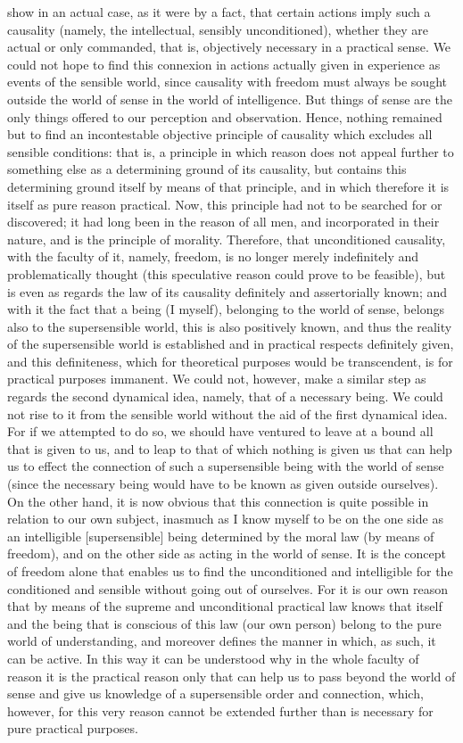 \documentclass[12pt]{article}
\begin{document}
show in an actual case, as it were by a fact, that certain actions imply such a causality (namely, the intellectual, sensibly unconditioned), whether they are actual or only commanded, that is, objectively necessary in a practical sense. We could not hope to find this connexion in actions actually given in experience as events of the sensible world, since causality with freedom must always be sought outside the world of sense in the world of intelligence. But things of sense are the only things offered to our perception and observation. Hence, nothing remained but to find an incontestable objective principle of causality which excludes all sensible conditions: that is, a principle in which reason does not appeal further to something else as a determining ground of its causality, but contains this determining ground itself by means of that principle, and in which therefore it is itself as pure reason practical. Now, this principle had not to be searched for or discovered; it had long been in the reason of all men, and incorporated in their nature, and is the principle of morality. Therefore, that unconditioned causality, with the faculty of it, namely, freedom, is no longer merely indefinitely and problematically thought (this speculative reason could prove to be feasible), but is even as regards the law of its causality definitely and assertorially known; and with it the fact that a being (I myself), belonging to the world of sense, belongs also to the supersensible world, this is also positively known, and thus the reality of the supersensible world is established and in practical respects definitely given, and this definiteness, which for theoretical purposes would be transcendent, is for practical purposes immanent. We could not, however, make a similar step as regards the second dynamical idea, namely, that of a necessary being. We could not rise to it from the sensible world without the aid of the first dynamical idea. For if we attempted to do so, we should have ventured to leave at a bound all that is given to us, and to leap to that of which nothing is given us that can help us to effect the connection of such a supersensible being with the world of sense (since the necessary being would have to be known as given outside ourselves). On the other hand, it is now obvious that this connection is quite possible in relation to our own subject, inasmuch as I know myself to be on the one side as an intelligible [supersensible] being determined by the moral law (by means of freedom), and on the other side as acting in the world of sense. It is the concept of freedom alone that enables us to find the unconditioned and intelligible for the conditioned and sensible without going out of ourselves. For it is our own reason that by means of the supreme and unconditional practical law knows that itself and the being that is conscious of this law (our own person) belong to the pure world of understanding, and moreover defines the manner in which, as such, it can be active. In this way it can be understood why in the whole faculty of reason it is the practical reason only that can help us to pass beyond the world of sense and give us knowledge of a supersensible order and connection, which, however, for this very reason cannot be extended further than is necessary for pure practical purposes.
\end{document}

